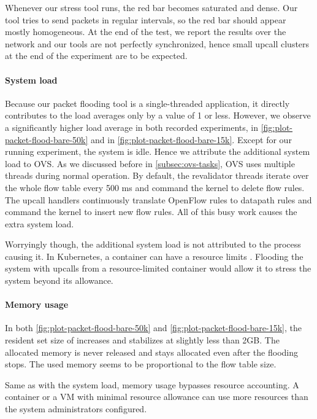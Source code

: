 Whenever our stress tool runs, the red bar becomes saturated and dense. Our tool tries to send packets in regular intervals, so the red bar should appear mostly homogeneous. At the end of the test, we report the results over the network and our tools are not perfectly synchronized, hence small upcall clusters at the end of the experiment are to be expected.

\paragraph{System load}
Because our packet flooding tool is a single-threaded application, it directly contributes to the load averages only by a value of 1 or less. However, we observe a significantly higher load average in both recorded experiments, in \cref{fig:plot-packet-flood-bare-50k} and in \cref{fig:plot-packet-flood-bare-15k}. Except for our running experiment, the system is idle. Hence we attribute the additional system load to OVS. As we discussed before in \cref{subsec:ovs-tasks}, OVS uses multiple threads during normal operation. By default, the revalidator threads iterate over the whole flow table every 500 \si{\milli\second} and command the kernel to delete flow rules. The upcall handlers continuously translate OpenFlow rules to datapath rules and command the kernel to insert new flow rules. All of this busy work causes the extra system load.

Worryingly though, the additional system load is not attributed to the process causing it. In Kubernetes, a container can have a resource limits \cite{KubernetesResourceManagement}. Flooding the system with upcalls from a resource-limited container would allow it to stress the system beyond its allowance. 

\paragraph{Memory usage}
\label{par:memory-usage}
In both \cref{fig:plot-packet-flood-bare-50k} and \cref{fig:plot-packet-flood-bare-15k}, the resident set size of  increases and stabilizes at slightly less than 2GB. The allocated memory is never released and stays allocated even after the flooding stops. The used memory seems to be proportional to the flow table size.

Same as with the system load, memory usage bypasses resource accounting. A container or a VM with minimal resource allowance can use more resources than the system administrators configured.

